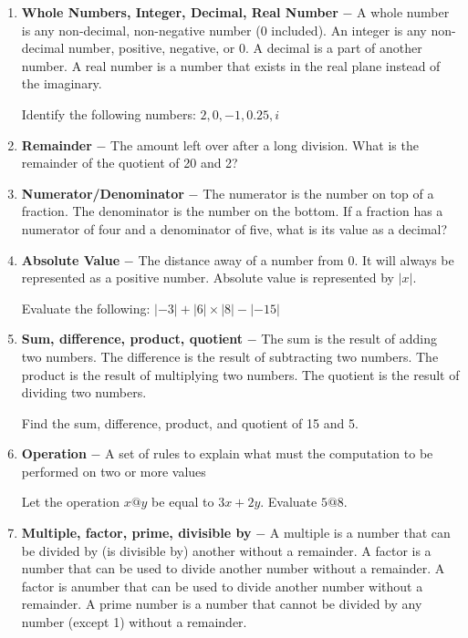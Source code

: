 \bigskip
\begin{enumerate}[label=\bfseries\arabic*.]
\item \textbf{Whole Numbers, Integer, Decimal, Real Number} $-$ A whole number is any non-decimal, non-negative number (0 included). An integer is any non-decimal number, positive, negative, or 0. A decimal is a part of another number. A real number is a number that exists in the real plane instead of the imaginary.

\bigskip
\indent Identify the following numbers: $2, 0, -1, 0.25, i$

\vfill\item \textbf{Remainder} $-$ The amount left over after a long division. What is the remainder of the quotient of 20 and 2?

\vfill
\newpage
\item \textbf{Numerator/Denominator} $-$ The numerator is the number on top of a fraction. The denominator is the number on the bottom. If a fraction has a numerator of four and a denominator of five, what is its value as a decimal?

\vfill\item \textbf{Absolute Value} $-$ The distance away of a number from 0. It will always be represented as a positive number. Absolute value is represented by $|x|$.

\bigskip
\indent Evaluate the following: $|-3|+|6|\times|8|-|-15|$

\vfill\item \textbf{Sum, difference, product, quotient} $-$ The sum is the result of adding two numbers. The difference is the result of subtracting two numbers. The product is the result of multiplying two numbers. The quotient is the result of dividing two numbers.

\bigskip
\indent Find the sum, difference, product, and quotient of 15 and 5.

\vfill\item \textbf{Operation} $-$ A set of rules to explain what must the computation to be performed on two or more values

\bigskip
\indent Let the operation $x@y$ be equal to $3x+2y$. Evaluate $5@8$.

\vfill\item \textbf{Multiple, factor, prime, divisible by} $-$ A multiple is a number that can be divided by (is divisible by) another without a remainder. A factor is a number that can be used to divide another number without a remainder. A factor is anumber that can be used to divide another number without a remainder. A prime number is a number that cannot be divided by any number (except 1) without a remainder.


\end{enumerate}
